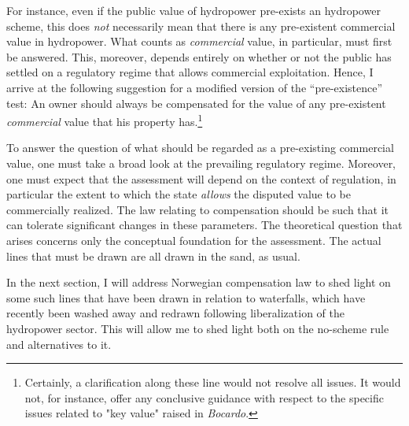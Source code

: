 For instance, even if the public value of hydropower pre-exists an hydropower scheme, this does \emph{not} necessarily mean that there is any pre-existent commercial value in hydropower. What counts as {\it commercial} value, in particular, must first be answered. This, moreover, depends entirely on whether or not the public has settled on a regulatory regime that allows commercial exploitation.
Hence, I arrive at the following suggestion for a modified version of the ``pre-existence'' test: An owner should always be compensated for the value of any pre-existent \emph{commercial} value that his property has.\footnote{Certainly, a clarification along these line would not resolve all issues. It would not, for instance, offer any conclusive guidance with respect to the specific issues related to "key value" raised in \emph{Bocardo}.} 

To answer the question of what should be regarded as a pre-existing commercial value, one must take a broad look at the prevailing regulatory regime. Moreover, one must expect that the assessment will depend on the context of regulation, in particular the extent to which the state \emph{allows} the disputed value to be commercially realized. The law relating to compensation should be such that it can tolerate significant changes in these parameters. The theoretical question that arises concerns only the conceptual foundation for the assessment. The actual lines that must be drawn are all drawn in the sand, as usual.

In the next section, I will address Norwegian compensation law to shed light on some such lines that have been drawn in relation to waterfalls, which have recently been washed away and redrawn following liberalization of the hydropower sector. This will allow me to shed light both on the no-scheme rule and alternatives to it. 

